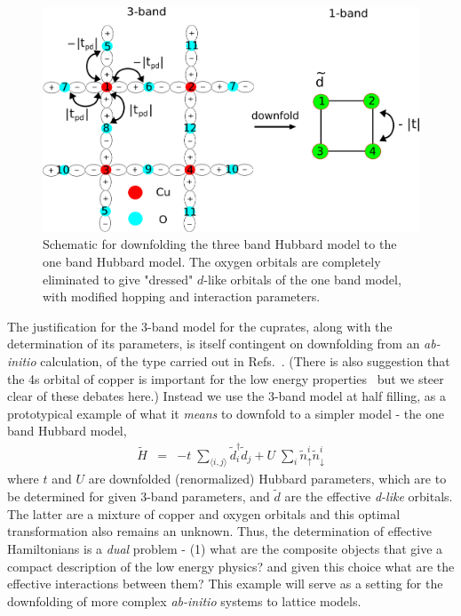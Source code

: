 \begin{figure}[htpb]
\centering
\includegraphics[width=1\linewidth]{./Figures/three_band_figure.pdf}
\caption{Schematic for downfolding the three band Hubbard model to the one band Hubbard model. 
The oxygen orbitals are completely eliminated to give "dressed" $d$-like orbitals of the one band model, with modified hopping 
and interaction parameters.}
\label{fig:threeband} 
\end{figure}	

The justification for the 3-band model for the cuprates, along with the determination of its parameters, 
is itself contingent on downfolding from an \emph{ab-initio} calculation, 
of the type carried out in Refs.~\cite{Wagner_Abbamonte}. (There is also suggestion that the 4s orbital of copper is important 
for the low energy properties~\cite{Pavirini} but we steer clear of these debates here.) 
Instead we use the 3-band model at half filling, as a prototypical example of what it \emph{means} to downfold to 
a simpler model - the one band Hubbard model, 
\begin{eqnarray}
	\tilde{H} &=&  -t \;\sum_{\langle i,j \rangle} \tilde{d}_i^{\dagger} \tilde{d}_j + U \;\sum_{i} \tilde{n}^{i}_{\uparrow} \tilde{n}^{i}_{\downarrow}
\label{eq:oneband}
\end{eqnarray}
where $t$ and $U$ are downfolded (renormalized) Hubbard parameters, which are to 
be determined for given 3-band parameters, and $\tilde{d}$ are the effective \emph{d-like} orbitals. 
The latter are a mixture of copper and oxygen orbitals and this optimal transformation also remains an unknown. Thus, 
the determination of effective Hamiltonians is a \emph{dual} problem - (1) what are the composite objects that give a 
compact description of the low energy physics? and given this choice what are the effective interactions between them?  
This example will serve as a setting for the downfolding of more complex \emph{ab-initio} systems to lattice 
models. 

